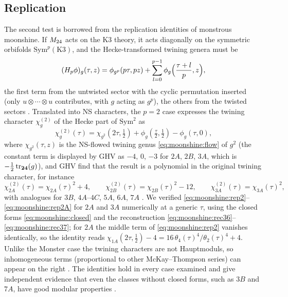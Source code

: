 \subsection{Replication}\label{sec:moonshine:replication}
The second test is borrowed from the replication identities of monstrous moonshine. If
$M_{24}$ acts on the K3 theory, it acts diagonally on the symmetric orbifolds
$\mathrm{Sym}^p(\mathrm{K3})$, and the Hecke-transformed twining genera must be
\begin{equation}\label{eq:moonshine:hecke}
  (H_p\phi)_g(\tau,z)=\phi_{g^p}(p\tau,pz)+\sum_{l=0}^{p-1}\phi_g\Bigl(\frac{\tau+l}{p},z\Bigr),
\end{equation}
the first term from the untwisted sector with the cyclic permutation inserted (only
$u\otimes\cdots\otimes u$ contributes, with $g$ acting as $g^p$), the others from the twisted
sectors . Translated into NS characters, the $p=2$ case
expresses the twining character $\chi^{(2)}_g$ of the Hecke part of $\mathrm{Sym}^2$ as
\begin{equation}\label{eq:moonshine:rep2}
  \chi^{(2)}_g(\tau)=\chi_{g^2}(2\tau,\tfrac12)+\phi_g(\tfrac\tau2,\tfrac12)-\phi_g(\tau,0),
\end{equation}
where $\chi_{g^2}(\tau,z)$ is the NS-flowed twining genus \eqref{eq:moonshine:flow} of
$g^2$ (the constant term is displayed by GHV as $-4$, $0$, $-3$ for $2A$, $2B$, $3A$, which
is $-\tfrac12\operatorname{tr}_{\mathbf{24}}(g)$), and GHV find that the result is a polynomial in the
original twining character, for instance
\begin{equation}\label{eq:moonshine:rep2A}
  \chi^{(2)}_{2A}(\tau)=\chi_{2A}(\tau)^2+4,\qquad
  \chi^{(2)}_{2B}(\tau)=\chi_{2B}(\tau)^2-12,\qquad
  \chi^{(2)}_{3A}(\tau)=\chi_{3A}(\tau)^2,
\end{equation}
with analogues for $3B$, $4A$--$4C$, $5A$, $6A$, $7A$ . We verified \eqref{eq:moonshine:rep2}--\eqref{eq:moonshine:rep2A} for $2A$
and $3A$ numerically at a generic $\tau$, using the closed forms \eqref{eq:moonshine:closed}
and the reconstruction \eqref{eq:moonshine:rec36}--\eqref{eq:moonshine:rec37}; for $2A$ the
middle term of \eqref{eq:moonshine:rep2} vanishes identically, so the identity reads
$\chi_{1A}(2\tau,\tfrac12)-4=16\,\theta_4(\tau)^4/\theta_2(\tau)^4+4$. Unlike the Monster case the twining characters are not Hauptmoduls, so
inhomogeneous terms (proportional to other McKay--Thompson series) can appear on the right
. The identities hold in every case examined and give
independent evidence that even the classes without closed forms, such as $3B$ and $7A$,
have good modular properties .

